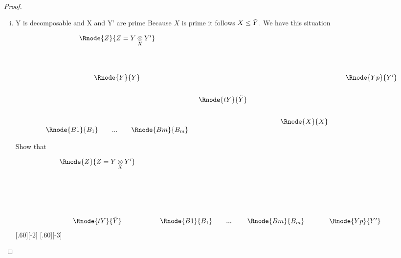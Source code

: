 \documentclass[10pt,a4paper]{scrartcl}
\begin{document}
\begin{proof}
\begin{enumerate}[(i)]
\item {Y is decomposable and X and Y' are prime}
Because $X$ is prime it follows $X \leq \tilde{Y}$. We have this situation

\begin{center}
\begin{displaymath}
\begin{array}{c c p{1.0cm} c p{0.2cm}c}
  \Rnode{Z}{Z=\crossx{Y}{Y'}{X}} & &                       & &  &                  \\ [1.6cm]
  \Rnode{Y}{Y} & &                       & &  & \Rnode{Yp}{Y'}   \\ [0.7cm]
	             &  \Rnode{tY}{\pbase{Y}} & &  &                  \\ [0.7cm]
	             & &                       & \Rnode{X}{X} & &      \\
	 \begin{array}{cp{0cm}c   p{0cm}     c  }					
   \Rnode{B1}{B_1}&   & ... & & \Rnode{Bm}{B_m}
	 \end{array} 
	 & & & &                                                
\end{array} 
\end{displaymath}
\end{center}

Show that 

\begin{center}
\begin{displaymath}
\begin{array}{c p{0.4cm} c p{0.4cm} c }
\Rnode{Z}{Z=\crossx{Y}{Y'}{X}} && &&      \\ [2.6cm]
\Rnode{tY}{\pbase{Y}}&& \begin{array}{cp{0cm}c   p{0.1cm}     c  }					
                             \Rnode{B1}{B_1}&   & ... & & \Rnode{Bm}{B_m}
	                      \end{array} 
	 && \Rnode{Yp}{Y'}                                              
\end{array} 
\end{displaymath}
[.60][-2]
[.60][-3]
\end{center}


\end{enumerate}
\end{proof}
\end{document}
